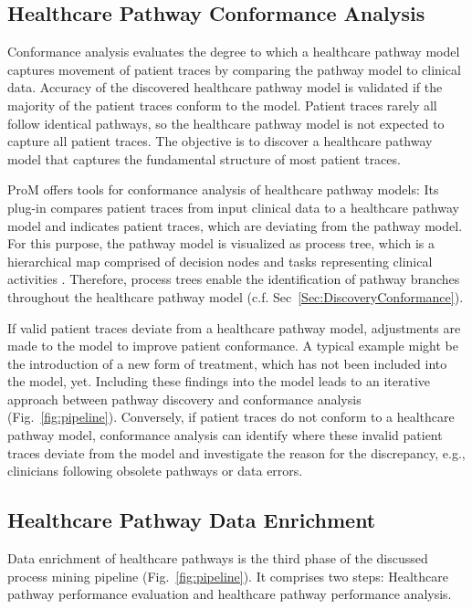 \subsection{Healthcare Pathway Conformance Analysis}
Conformance analysis evaluates the degree to which a healthcare pathway model captures movement of patient traces by comparing the pathway model to clinical data. 
Accuracy of the discovered healthcare pathway model is validated if the majority of the patient traces conform to the model. Patient traces rarely all follow identical pathways, so the healthcare pathway model is not expected to capture all patient traces. The objective is to discover a healthcare pathway model that captures the fundamental structure of most patient traces. 

ProM offers tools for conformance analysis of healthcare
pathway models: Its plug-in  compares
patient traces from input clinical data to a healthcare pathway model
and indicates patient traces, which are deviating from the pathway
model.
For this purpose, the pathway model is visualized as process tree,
which is a hierarchical map comprised of decision nodes and
tasks representing clinical activities
\cite{25a7fd818bf44606a903d9b78b95cdd3}.
Therefore, process trees enable the identification of pathway branches
throughout the healthcare pathway model (c.f. Sec~\ref{Sec:DiscoveryConformance}).

If valid patient traces deviate from a healthcare pathway model, 
adjustments are made to the model to improve patient conformance.
A typical example might be the introduction of a new form of
treatment, which has not been included into the model, yet.
Including these findings into the model leads to an iterative approach
between pathway discovery and conformance analysis (Fig.~\ref{fig:pipeline}).
Conversely, if patient traces do not conform to a healthcare pathway
model, conformance analysis can identify where these invalid
patient traces deviate from the model and investigate the reason for
the discrepancy, e.g., clinicians following obsolete pathways or data errors.

\subsection{Healthcare Pathway Data Enrichment}
Data enrichment of healthcare pathways is the third phase of the
discussed process mining pipeline (Fig.~\ref{fig:pipeline}).
It comprises two steps: Healthcare pathway performance evaluation and
healthcare pathway performance analysis.

